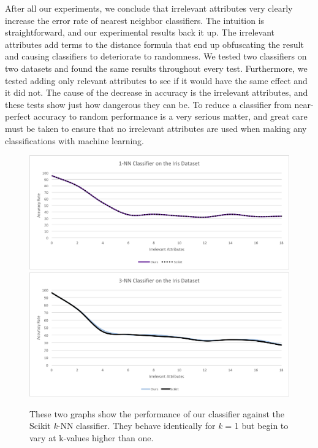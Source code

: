 \documentclass{article}
\begin{document}
After all our experiments, we conclude that irrelevant attributes very clearly increase the error rate of nearest neighbor classifiers. The intuition is straightforward, and our experimental results back it up. The irrelevant attributes add terms to the distance formula that end up obfuscating the result and causing classifiers to deteriorate to randomness. We tested two classifiers on two datasets and found the same results throughout every test. Furthermore, we tested adding only relevant attributes to see if it would have the same effect and it did not. The cause of the decrease in accuracy is the irrelevant attributes, and these tests show just how dangerous they can be. To reduce a classifier from near-perfect accuracy to random performance is a very serious matter, and great care must be taken to ensure that no irrelevant attributes are used when making any classifications with machine learning.


 

\begin{figure}[hbt]
\centering
\includegraphics[scale=0.7]{ours-vs-scikit} \\
\includegraphics[scale=0.7]{ours-vs-scikit2} 
\caption{These two graphs show the performance of our classifier against the Scikit \textit{k}-NN classifier. They behave identically for \textit{k} = 1 but begin to vary at k-values higher than one.}
\end{figure}
\end{document}
